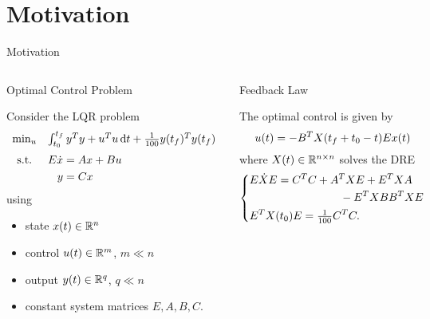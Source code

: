 \section{Motivation}

\begin{frame}{Motivation}
  \begin{columns}[t,onlytextwidth]
  \begin{block}{\strut Optimal Control Problem}
    Consider the \acf{LQR} problem
    \begin{equation*}
      \begin{array}{cl}
        \min_u & \int_{t_0}^{t_f} y^\T y + u^\T u \dt + \tfrac{1}{100} y(t_f)^\T y(t_f) \medskip\\
        \text{s.t.} & \begin{aligned}[t]
          E \dot x &= Ax + Bu \\
          y &= Cx
        \end{aligned}
      \end{array}
    \end{equation*}
    using
    \begin{itemize}
      \item
        state $x(t)\in\mathbb{R}^n$
      \item
        control $u(t)\in\mathbb{R}^m$, $m\ll n$
      \item
        output $y(t)\in\mathbb{R}^q$, $q\ll n$
      \item
        constant system matrices $E,A,B,C$.
    \end{itemize}
  \end{block}
  \pause
  \begin{block}{\strut Feedback Law \parencite[e.g.][]{Locatelli2011}}
    The optimal control is given by
    \begin{equation*}
      u(t) = -
        B^T X(t_f+t_0-t) E
      x(t)
    \end{equation*}
    where $X(t)\in\mathbb{R}^{n\times n}$ solves the \acf{DRE}
    \begin{equation*}
      \left\{
        \begin{lgathered}
          E\dot X E = \begin{multlined}[t]
            C^\T C + A^\T X E + E^\T X A \\ - E^\T X BB^\T X E
          \end{multlined} \\
          E^\T X(t_0) E = \tfrac{1}{100} C^\T C
          .
        \end{lgathered}
      \right.
    \end{equation*}
  \end{block}
  \end{columns}
\end{frame}

